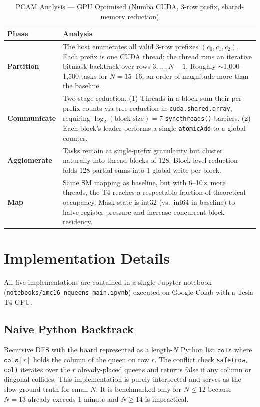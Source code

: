 \documentclass[12pt, letterpaper]{article}
\begin{document}
\begin{table}[H]
\centering
\caption{PCAM Analysis --- GPU Optimised (Numba CUDA, 3-row prefix, shared-memory reduction)}
\begin{tabular}{@{}p{3cm}p{10cm}@{}}
\toprule
\textbf{Phase} & \textbf{Analysis} \\
\midrule
\textbf{Partition} & The host enumerates all valid 3-row prefixes $(c_0, c_1, c_2)$. Each prefix is one CUDA thread; the thread runs an iterative bitmask backtrack over rows $3, \ldots, N-1$. Roughly $\sim$1{,}000--1{,}500 tasks for $N = 15$--$16$, an order of magnitude more than the baseline. \\
\textbf{Communicate} & Two-stage reduction. (1) Threads in a block sum their per-prefix counts via tree reduction in \texttt{cuda.shared.array}, requiring $\log_2(\text{block size}) = 7$ \texttt{syncthreads()} barriers. (2) Each block's leader performs a single \texttt{atomicAdd} to a global counter. \\
\textbf{Agglomerate} & Tasks remain at single-prefix granularity but cluster naturally into thread blocks of 128. Block-level reduction folds 128 partial sums into 1 global write per block. \\
\textbf{Map} & Same SM mapping as baseline, but with 6--10$\times$ more threads, the T4 reaches a respectable fraction of theoretical occupancy. Mask state is int32 (vs.\ int64 in baseline) to halve register pressure and increase concurrent block residency. \\
\bottomrule
\end{tabular}
\label{tab:pcam_gpu_opt}
\end{table}

\section{Implementation Details}
\label{sec:impl}

All five implementations are contained in a single Jupyter notebook (\texttt{notebooks/imc16\_nqueens\_main.ipynb}) executed on Google Colab with a Tesla T4 GPU.

\subsection{Naive Python Backtrack}

Recursive DFS with the board represented as a length-$N$ Python list $\texttt{cols}$ where $\texttt{cols}[r]$ holds the column of the queen on row $r$. The conflict check \texttt{safe(row, col)} iterates over the $r$ already-placed queens and returns false if any column or diagonal collides. This implementation is purely interpreted and serves as the slow ground-truth for small $N$. It is benchmarked only for $N \leq 12$ because $N = 13$ already exceeds 1 minute and $N \geq 14$ is impractical.
\end{document}
